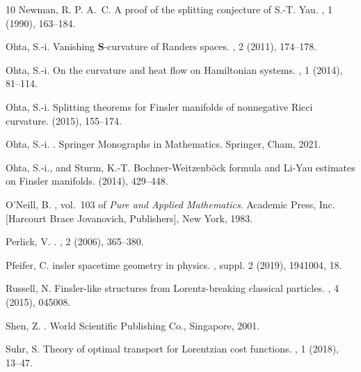 \documentclass[a4paper,11pt]{article}
\numberwithin{equation}{section}
\theoremstyle{definition}
\theoremstyle{plain}
\begin{document}
\begin{thebibliography}{10}
	{\sc Newman, R. P. A.~C.}
	\newblock A proof of the splitting conjecture of {S}.-{T}. {Y}au.
	, 1 (1990), 163--184.
	
	{\sc Ohta, S.-i.}
	\newblock Vanishing {$\mathbf S$}-curvature of {R}anders spaces.
	, 2 (2011), 174--178.
	
	{\sc Ohta, S.-i.}
	\newblock On the curvature and heat flow on {H}amiltonian systems.
	, 1 (2014), 81--114.
	
	{\sc Ohta, S.-i.}
	\newblock Splitting theorems for {F}insler manifolds of nonnegative {R}icci
	curvature.
	 (2015), 155--174.
	
	{\sc Ohta, S.-i.}
	.
	\newblock Springer Monographs in Mathematics. Springer, Cham, 2021.
	
	{\sc Ohta, S.-i., and Sturm, K.-T.}
	\newblock Bochner-{W}eitzenb\"ock formula and {L}i-{Y}au estimates on {F}insler
	manifolds.
	 (2014), 429--448.
	
	{\sc O'Neill, B.}
	,
	vol.~103 of {\em Pure and Applied Mathematics}.
	\newblock Academic Press, Inc. [Harcourt Brace Jovanovich, Publishers], New
	York, 1983.
	
	{\sc Perlick, V.}
	.
	, 2 (2006), 365--380.
	
	{\sc Pfeifer, C.}
	insler spacetime geometry in physics.
	, suppl. 2 (2019), 1941004, 18.
	
	{\sc Russell, N.}
	\newblock Finsler-like structures from {L}orentz-breaking classical particles.
	, 4 (2015), 045008.
	
	{\sc Shen, Z.}
	.
	\newblock World Scientific Publishing Co., Singapore, 2001.
	
	{\sc Suhr, S.}
	\newblock Theory of optimal transport for {L}orentzian cost functions.
	, 1 (2018), 13--47.
	

\end{thebibliography}
\end{document}
